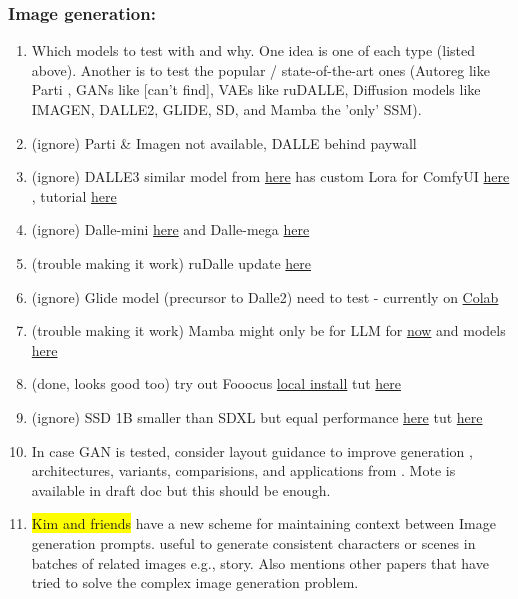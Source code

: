 \subsubsection{Image generation:}
\begin{enumerate}
    \item Which models to test with and why. One idea is one of each type (listed above). Another is to test the popular / state-of-the-art ones (Autoreg like Parti \cite{yu2022scalingautoregressivemodelscontentrich}, GANs like [can't find], VAEs \cite{kingma2013auto} like ruDALLE, Diffusion models like IMAGEN, DALLE2, GLIDE, SD, and Mamba the 'only' SSM). 
    \item (ignore) Parti \& Imagen not available, DALLE behind paywall
    \item (ignore) DALLE3 similar model from \href{https://huggingface.co/ehristoforu/dalle-3-xl-v2}{here}  has custom Lora for ComfyUI \href{https://github.com/jitcoder/lora-info}{here} , tutorial \href{https://www.youtube.com/watch?v=uU4jUV4rm_A}{here} 
    \item (ignore) Dalle-mini \href{https://huggingface.co/dalle-mini/dalle-mini}{here}  and Dalle-mega \href{https://huggingface.co/dalle-mini/dalle-mega}{here} 
    \item (trouble making it work) ruDalle update \href{https://huggingface.co/ai-forever/Kandinsky3.1}{here} 
    \item (ignore) Glide model (precursor to Dalle2) need to test - currently on \href{https://github.com/openai/glide-text2im}{Colab} 
    \item (trouble making it work) Mamba might only be for LLM for \href{https://github.com/state-spaces/mamba}{now}  and models \href{https://huggingface.co/state-spaces}{here} 
    \item (done, looks good too) try out Fooocus \href{https://github.com/lllyasviel/Fooocus}{local install}  tut \href{https://www.youtube.com/watch?v=aiZWEbUjAGw}{here} 
    \item (ignore) SSD 1B smaller than SDXL but equal performance \href{https://huggingface.co/segmind/SSD-1B}{here} tut \href{https://www.youtube.com/watch?v=0XpKQrBrZTs}{here} 
    \item In case GAN is tested, consider layout guidance to improve generation \cite{zakraoui2021improving}, architectures, variants, comparisions, and applications from \cite{creswell2018generative}. Mote is available in draft doc but this should be enough.
    \item \colorbox{yellow}{Kim and friends} \cite{Kim2024Context-Aware-Gen} have a new scheme for maintaining context between Image generation prompts. useful to generate consistent characters or scenes in batches of related images e.g., story. Also mentions other papers that have tried to solve the complex image generation problem.
\end{enumerate}

